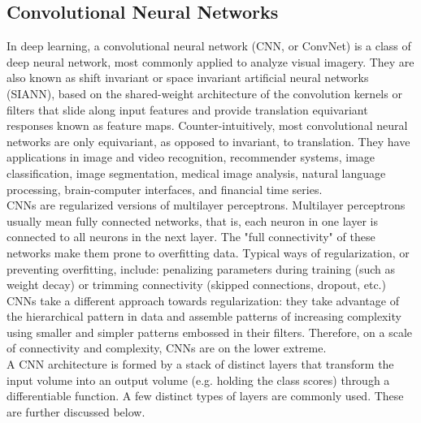 \documentclass[12pt,a4paper]{article}
\begin{document}
\subsection{Convolutional Neural Networks}
In deep learning, a convolutional neural network (CNN, or ConvNet) is a class of deep neural network, most commonly applied to analyze visual imagery. They are also known as shift invariant or space invariant artificial neural networks (SIANN), based on the shared-weight architecture of the convolution kernels or filters that slide along input features and provide translation equivariant responses known as feature maps. Counter-intuitively, most convolutional neural networks are only equivariant, as opposed to invariant, to translation. They have applications in image and video recognition, recommender systems, image classification, image segmentation, medical image analysis, natural language processing, brain-computer interfaces, and financial time series.
\\
CNNs are regularized versions of multilayer perceptrons. Multilayer perceptrons usually mean fully connected networks, that is, each neuron in one layer is connected to all neurons in the next layer. The "full connectivity" of these networks make them prone to overfitting data. Typical ways of regularization, or preventing overfitting, include: penalizing parameters during training (such as weight decay) or trimming connectivity (skipped connections, dropout, etc.) CNNs take a different approach towards regularization: they take advantage of the hierarchical pattern in data and assemble patterns of increasing complexity using smaller and simpler patterns embossed in their filters. Therefore, on a scale of connectivity and complexity, CNNs are on the lower extreme.\\
A CNN architecture is formed by a stack of distinct layers that transform the input volume into an output volume (e.g. holding the class scores) through a differentiable function. A few distinct types of layers are commonly used. These are further discussed below.
\end{document}
